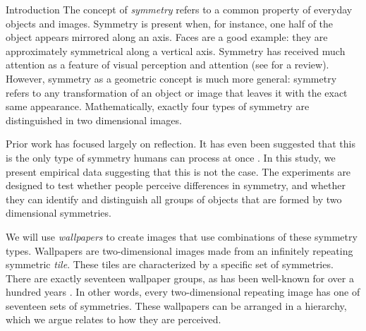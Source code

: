 \begin{block}{Introduction}
The concept of \emph{symmetry} refers to a common property of everyday objects and images. Symmetry is present when, for instance, one half of the object appears mirrored along an axis. Faces are a good example: they are approximately symmetrical along a vertical axis. Symmetry has received much attention as a feature of visual perception and attention (see \citep{review} for a review). However, symmetry as a geometric concept is much more general: symmetry refers to any transformation of an object or image that leaves it with the exact same appearance. Mathematically, exactly four types of symmetry are distinguished in two dimensional images.\linebreak

Prior work has focused largely on reflection. It has even been suggested that this is the only type of symmetry humans can process at once \citep{bio}. In this study, we present empirical data suggesting that this is not the case. The experiments are designed to test whether people perceive differences in symmetry, and whether they can identify and distinguish all groups of objects that are formed by two dimensional symmetries. \linebreak

We will use \emph{wallpapers} to create images that use combinations of these symmetry types. Wallpapers are two-dimensional images made from an infinitely repeating symmetric \textit{tile}. These tiles are characterized by a specific set of symmetries. There are exactly seventeen wallpaper groups, as has been well-known for over a hundred years \citep{wallpaper-proof}. In other words, every two-dimensional repeating image has one of seventeen sets of symmetries. These wallpapers can be arranged in a hierarchy, which we argue relates to how they are perceived.
\end{block}
